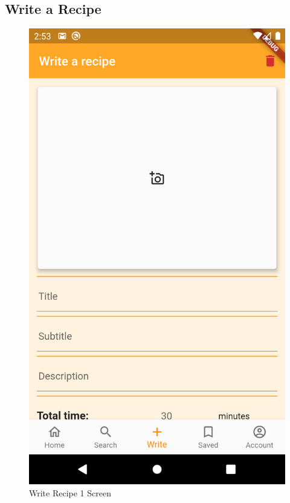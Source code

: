 \subsection{Write a Recipe}
\begin{figure}[H]
	\begin{minipage}{0.31\textwidth}
		\centering
		\includegraphics[width = .9\linewidth]{img/Write_1.png}
		\caption{Write Recipe 1 Screen}
	\end{minipage}\hfill
	\begin{minipage}{0.31\textwidth}
		\centering

\end{minipage}
\end{figure}
